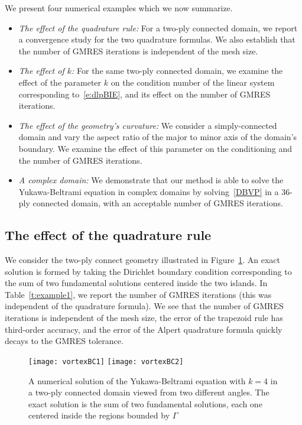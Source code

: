 We present four numerical examples which we now summarize.
\begin{itemize}
  \item{\em{The effect of the quadrature rule}:} For a two-ply connected
  domain, we report a convergence study for the two quadrature formulas.
  We also establish that the number of GMRES iterations is independent
  of the mesh size.

  \item{\em{The effect of $k$}:} For the same two-ply connected domain,
  we examine the effect of the parameter $k$ on the condition number of
  the linear system corresponding to~\eqref{e:dlpBIE}, and its effect on
  the number of GMRES iterations.

  \item{\em{The effect of the geometry's curvature}:} We consider a
  simply-connected domain and vary the aspect ratio of the major to
  minor axis of the domain's boundary.  We examine the effect of this
  parameter on the conditioning and the number of GMRES iterations.

  \item{\em{A complex domain}:} We demonstrate that our method is able
  to solve the Yukawa-Beltrami equation in complex domains by
  solving~\eqref{DBVP} in a 36-ply connected domain, with an acceptable
  number of GMRES iterations.
\end{itemize}


\subsection{The effect of the quadrature rule}
We consider the two-ply connect geometry illustrated in
Figure~\ref{f:twoply}.  An exact solution is formed by taking the
Dirichlet boundary condition corresponding to the sum of two fundamental
solutions centered inside the two islands.  In Table~\ref{t:example1},
we report the number of GMRES iterations (this was independent of the
quadrature formula).  We see that the number of GMRES iterations is
independent of the mesh size, the error of the trapezoid rule has
third-order accuracy, and the error of the Alpert quadrature formula
quickly decays to the GMRES tolerance.

\begin{figure}[htps]
  \texttt{[image: vortexBC1]}
  \texttt{[image: vortexBC2]}
\caption{\label{f:twoply} A numerical solution of the Yukawa-Beltrami
equation with $k=4$ in a two-ply connected domain viewed from two
different angles.  The exact solution is the sum of two fundamental
solutions, each one centered inside the regions bounded by $\Gamma$}
\end{figure}


